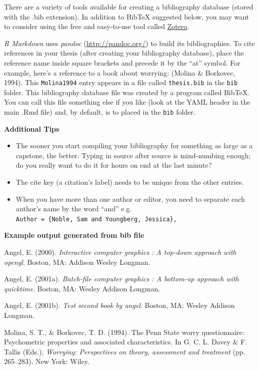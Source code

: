 \documentclass[12pt,oneside]{chicagocapstone}
\providecommand{\tightlist}{%
  \setlength{\itemsep}{0pt}\setlength{\parskip}{0pt}}
\begin{document}

\noindent

\setlength{\parindent}{-0.20in} \setlength{\leftskip}{0.20in}
\setlength{\parskip}{8pt}

There are a variety of tools available for creating a bibliography
database (stored with the .bib extension). In addition to BibTeX
suggested below, you may want to consider using the free and easy-to-use
tool called \href{https://www.zotero.org/}{Zotero}.

\emph{R Markdown} uses \emph{pandoc} (\url{http://pandoc.org/}) to build
its bibliographies. To cite references in your thesis (after creating
your bibliography database), place the reference name inside square
brackets and precede it by the ``at'' symbol. For example, here's a
reference to a book about worrying: (Molina \& Borkovec, 1994). This
\texttt{Molina1994} entry appears in a file called \texttt{thesis.bib}
in the \texttt{bib} folder. This bibliography database file was created
by a program called BibTeX. You can call this file something else if you
like (look at the YAML header in the main .Rmd file) and, by default, is
to placed in the \texttt{bib} folder.

\textbf{Additional Tips}
\begin{itemize}
\tightlist
\item
  The sooner you start compiling your bibliography for something as
  large as a capstone, the better. Typing in source after source is
  mind-numbing enough; do you really want to do it for hours on end at
  the last minute?
\item
  The cite key (a citation's label) needs to be unique from the other
  entries.
\item
  When you have more than one author or editor, you need to separate
  each author's name by the word ``and'' e.g.
  \texttt{Author\ =\ \{Noble,\ Sam\ and\ Youngberg,\ Jessica\},}
\end{itemize}
\textbf{Example output generated from bib file}

\hypertarget{refs}{}
\hypertarget{ref-angel2000}{}
Angel, E. (2000). \emph{Interactive computer graphics : A top-down
approach with opengl}. Boston, MA: Addison Wesley Longman.

\hypertarget{ref-angel2001}{}
Angel, E. (2001a). \emph{Batch-file computer graphics : A bottom-up
approach with quicktime}. Boston, MA: Wesley Addison Longman.

\hypertarget{ref-angel2002a}{}
Angel, E. (2001b). \emph{Test second book by angel}. Boston, MA: Wesley
Addison Longman.

\hypertarget{ref-Molina1994}{}
Molina, S. T., \& Borkovec, T. D. (1994). The Penn State worry
questionnaire: Psychometric properties and associated characteristics.
In G. C. L. Davey \& F. Tallis (Eds.), \emph{Worrying: Perspectives on
theory, assessment and treatment} (pp. 265--283). New York: Wiley.


\end{document}
